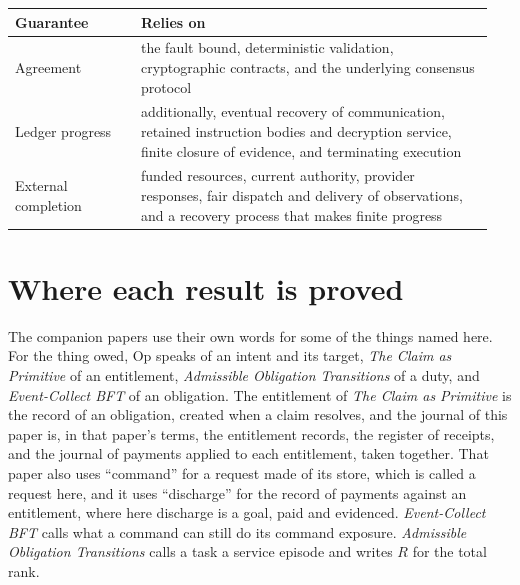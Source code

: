 \documentclass{momentum}
\begin{document}
\begin{center}
\begin{tabular}{@{}>{\raggedright\arraybackslash}p{0.25\linewidth}>{\raggedright\arraybackslash}p{0.70\linewidth}@{}}
\toprule
Guarantee & Relies on \\
\midrule
Agreement & the fault bound, deterministic validation, cryptographic contracts, and the underlying consensus protocol \\
Ledger progress & additionally, eventual recovery of communication, retained instruction bodies and decryption service, finite closure of evidence, and terminating execution \\
External completion & funded resources, current authority, provider responses, fair dispatch and delivery of observations, and a recovery process that makes finite progress \\
\bottomrule
\end{tabular}
\end{center}

\section{Where each result is proved}
\label{sec:reading}

The companion papers use their own words for some of the things named here. For the thing owed, Op speaks of an intent and its target, \emph{The Claim as Primitive} of an entitlement, \emph{Admissible Obligation Transitions} of a duty, and \emph{Event-Collect BFT} of an obligation. The entitlement of \emph{The Claim as Primitive} is the record of an obligation, created when a claim resolves, and the journal of this paper is, in that paper's terms, the entitlement records, the register of receipts, and the journal of payments applied to each entitlement, taken together. That paper also uses ``command'' for a request made of its store, which is called a request here, and it uses ``discharge'' for the record of payments against an entitlement, where here discharge is a goal, paid and evidenced. \emph{Event-Collect BFT} calls what a command can still do its command exposure. \emph{Admissible Obligation Transitions} calls a task a service episode and writes $R$ for the total rank.
\end{document}
